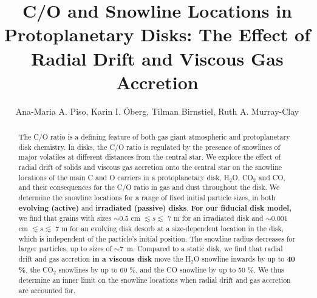 \documentclass[apj]{emulateapj}
\begin{document}


\title{C/O and Snowline Locations in Protoplanetary Disks: The Effect of Radial Drift and Viscous Gas Accretion}

\author{Ana-Maria A. Piso, Karin I. \"Oberg, Tilman Birnstiel, Ruth A. Murray-Clay}


\begin{abstract}
The C/O ratio is a defining feature of both gas giant atmospheric and protoplanetary disk chemistry. In disks, the C/O ratio is regulated by the presence of snowlines of major volatiles at different distances from the central star.
We explore the effect of radial drift of solids and viscous gas accretion onto the central star on the snowline locations of the main C and O carriers in a protoplanetary disk, H$_2$O, CO$_2$ and CO, and their consequences for the C/O ratio in gas and dust throughout the disk. We determine the snowline locations for a range of fixed initial particle sizes, in both \textbf{evolving (active)} and \textbf{irradiated (passive) disks}. \textbf{For our fiducial disk model,} we find that grains with sizes $\sim$$0.5$ cm $\lesssim s \lesssim$ 7 m for an irradiated disk and $\sim$$0.001$ cm $\lesssim s \lesssim$ 7 m for an evolving disk desorb %
at a %
size-dependent location in the disk, which is independent %
of the particle's initial position. The snowline radius decreases for larger particles, up to sizes of $\sim$7~m. %
Compared to a static disk, we find that radial drift and gas accretion \textbf{in a viscous disk} move the H$_2$O snowline inwards by up to \textbf{40 \%}, the CO$_2$ snowlines by up to 60 \%, and the CO snowline by up to 50 \%. We thus determine an inner limit on the snowline locations when radial drift and gas accretion are accounted for. %
\end{abstract}
\end{document}
